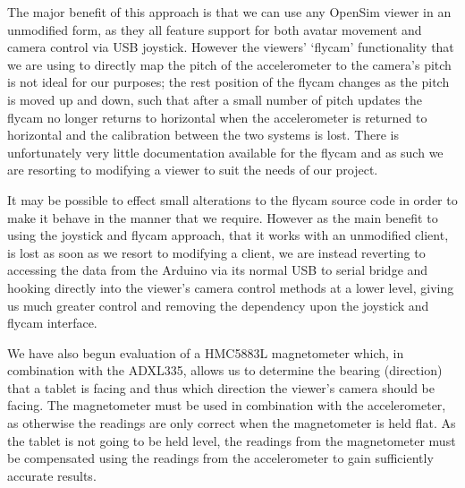 \documentclass[conference,a4paper]{IEEEtran}
\begin{document}
The major benefit of this approach is that we can use any OpenSim viewer in an unmodified form, as they all feature support for both avatar movement and camera control via USB joystick. However the viewers' `flycam' functionality that we are using to directly map the pitch of the accelerometer to the camera's pitch is not ideal for our purposes; the rest position of the flycam changes as the pitch is moved up and down, such that after a small number of pitch updates the flycam no longer returns to horizontal when the accelerometer is returned to horizontal and the calibration between the two systems is lost. There is unfortunately very little documentation available for the flycam and as such we are resorting to modifying a viewer to suit the needs of our project.

It may be possible to effect small alterations to the flycam source code in order to make it behave in the manner that we require. However as the main benefit to using the joystick and flycam approach, that it works with an unmodified client, is lost as soon as we resort to modifying a client, we are instead reverting to accessing the data from the Arduino via its normal USB to serial bridge and hooking directly into the viewer's camera control methods at a lower level, giving us much greater control and removing the dependency upon the joystick and flycam interface.

We have also begun evaluation of a HMC5883L magnetometer which, in combination with the ADXL335, allows us to determine the bearing (direction) that a tablet is facing and thus which direction the viewer's camera should be facing. The magnetometer must be used in combination with the accelerometer, as otherwise the readings are only correct when the magnetometer is held flat. As the tablet is not going to be held level, the readings from the magnetometer must be compensated using the readings from the accelerometer to gain sufficiently accurate results.

%
%
\end{document}
